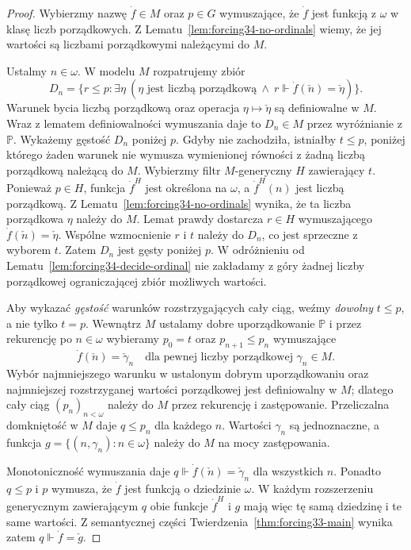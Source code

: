 \begin{proof}
Wybierzmy nazwę $\dot f\in M$
oraz $p\in G$ wymuszające, że
$\dot f$ jest funkcją z $\omega$
w klasę liczb porządkowych.
Z Lematu~\ref{lem:forcing34-no-ordinals}
wiemy, że jej wartości są
liczbami porządkowymi należącymi do $M$.

Ustalmy $n\in\omega$. W modelu $M$
rozpatrujemy zbiór
\[
 D_n=\{r\leq p:\exists\eta\
   (\eta\text{ jest liczbą porządkową}
    \ \land\
    r\Vdash\dot f(\check n)=\check\eta)\}.
\]
Warunek bycia liczbą porządkową
oraz operacja $\eta\mapsto\check\eta$
są definiowalne w $M$.
Wraz z lematem definiowalności
wymuszania daje to $D_n\in M$
przez wyróżnianie z $\mathbb P$.
Wykażemy gęstość $D_n$ poniżej $p$.
Gdyby nie zachodziła, istniałby
$t\leq p$, poniżej którego żaden
warunek nie wymusza wymienionej
równości z żadną liczbą porządkową
należącą do $M$.
Wybierzmy filtr $M$-generyczny
$H$ zawierający $t$. Ponieważ
$p\in H$, funkcja $\dot f^H$
jest określona na $\omega$, a
$\dot f^H(n)$ jest liczbą porządkową.
Z Lematu~\ref{lem:forcing34-no-ordinals}
wynika, że ta liczba porządkowa
$\eta$ należy do $M$.
Lemat prawdy dostarcza $r\in H$
wymuszającego
$\dot f(\check n)=\check\eta$.
Wspólne wzmocnienie $r$ i $t$
należy do $D_n$, co jest
sprzeczne z wyborem $t$.
Zatem $D_n$ jest gęsty poniżej $p$.
W odróżnieniu od
Lematu~\ref{lem:forcing34-decide-ordinal}
nie zakładamy z góry żadnej
liczby porządkowej ograniczającej
zbiór możliwych wartości.

Aby wykazać \emph{gęstość}
warunków rozstrzygających cały
ciąg, weźmy \emph{dowolny}
$t\leq p$, a nie tylko $t=p$.
Wewnątrz $M$ ustalamy
dobre uporządkowanie $\mathbb P$
i przez rekurencję po $n\in\omega$
wybieramy $p_0=t$ oraz
$p_{n+1}\leq p_n$ wymuszające
\[
 \dot f(\check n)=\check\gamma_n
 \quad\text{dla pewnej liczby
 porządkowej }\gamma_n\in M.
\]
Wybór najmniejszego warunku
w ustalonym dobrym uporządkowaniu
oraz najmniejszej rozstrzyganej
wartości porządkowej jest
definiowalny w $M$; dlatego
cały ciąg $(p_n)_{n<\omega}$
należy do $M$ przez rekurencję
i zastępowanie. Przeliczalna
domkniętość w $M$ daje
$q\leq p_n$ dla każdego $n$.
Wartości $\gamma_n$ są jednoznaczne,
a funkcja
$g=\{(n,\gamma_n):n\in\omega\}$
należy do $M$ na mocy zastępowania.

Monotoniczność wymuszania daje
$q\Vdash\dot f(\check n)=\check\gamma_n$
dla wszystkich $n$. Ponadto
$q\leq p$ i $p$ wymusza, że
$\dot f$ jest funkcją o dziedzinie
$\omega$. W każdym rozszerzeniu
generycznym zawierającym $q$
obie funkcje $\dot f^H$ i $g$
mają więc tę samą dziedzinę
i te same wartości. Z semantycznej
części Twierdzenia~\ref{thm:forcing33-main}
wynika zatem
$q\Vdash\dot f=\check g$.


\end{proof}
